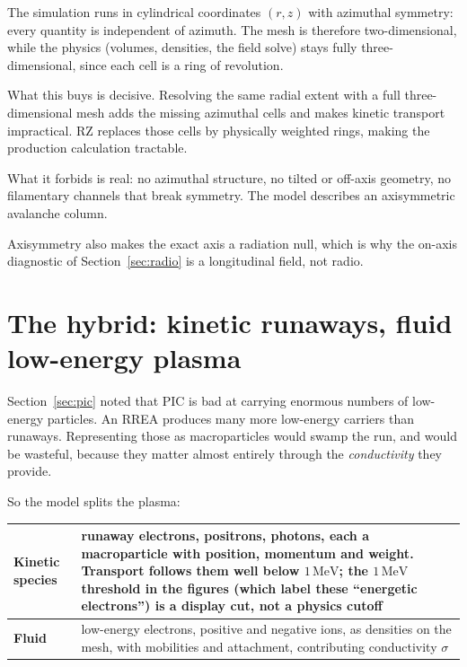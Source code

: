 \documentclass[11pt]{article}
\begin{document}
The simulation runs in cylindrical coordinates $(r,z)$ with azimuthal symmetry:
every quantity is independent of azimuth. The mesh is therefore
two-dimensional, while the physics (volumes, densities, the field solve) stays
fully three-dimensional, since each cell is a ring of revolution.

What this buys is decisive. Resolving the same radial extent with a full
three-dimensional mesh adds the missing azimuthal cells and makes kinetic
transport impractical. RZ replaces those cells by physically weighted rings,
making the production calculation tractable.

What it forbids is real: no azimuthal structure, no tilted or off-axis geometry,
no filamentary channels that break symmetry. The model describes an axisymmetric
avalanche column.

Axisymmetry also makes the exact axis a radiation null, which is why the
on-axis diagnostic of Section~\ref{sec:radio} is a longitudinal field, not
radio.

\section{The hybrid: kinetic runaways, fluid low-energy plasma}
\label{sec:hybrid}

Section~\ref{sec:pic} noted that PIC is bad at carrying enormous numbers of
low-energy particles. An RREA produces many more low-energy carriers than
runaways. Representing those
as macroparticles would swamp the run, and would be wasteful, because they
matter almost entirely through the \emph{conductivity} they provide.

So the model splits the plasma:

\begin{center}
\begin{tabular}{@{}>{\raggedright\arraybackslash}p{}>{\raggedright\arraybackslash}p{}@{}}
\toprule
\textbf{Kinetic species} & runaway electrons, positrons, photons, each a
macroparticle with position, momentum and weight. Transport follows them well
below $1\,\mathrm{MeV}$; the $1\,\mathrm{MeV}$ threshold in the figures (which
label these ``energetic electrons'') is a display cut, not a physics cutoff \\
\midrule
\textbf{Fluid} & low-energy electrons, positive and negative ions, as densities
on the mesh, with mobilities and attachment, contributing conductivity
$\sigma$ \\
\bottomrule
\end{tabular}
\end{center}
\end{document}
